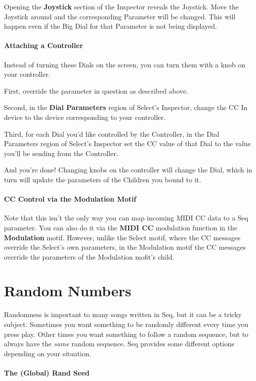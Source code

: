 \documentclass[twoside,10pt]{article}
\begin{document}
Opening the {\bf Joystick} section of the Inspector reveals the Joystick.  Move the Joystick around and the corresponding Parameter will be changed.  This will happen even if the Big Dial for that Parameter is not being displayed.

\paragraph{Attaching a Controller}
Instead of turning these Dials on the screen, you can turn them with a knob on your controller.  

First, override the parameter in question as described above.

Second, in the {\bf Dial Parameters} region of Select's Inspector, change the CC In device to the device corresponding to your controller.

Third, for each Dial you'd like controlled by the Controller, in the Dial Parameters region of Select's Inspector set the CC value of that Dial to the value you'll be sending from the Controller.

And you're done!  Changing knobs on the controller will change the Dial, which in turn will update the parameters of the Children you bound to it.

\paragraph{CC Control via the Modulation Motif}
Note that this isn't the only way you can map incoming MIDI CC data to a Seq parameter.  You can also do it via the {\bf MIDI CC} modulation function in the {\bf Modulation} motif.  However, unlike the Select motif, where the CC messages override the Select's own parameters, in the Modulation motif the CC messages override the parameters of the Modulation mofit's child.


\clearpage\section{Random Numbers}
\label{random}

Randomness is important to many songs written in Seq, but it can be a tricky subject.  Sometimes you want something to be randomly different every time you press play.  Other times you want something to follow a random sequence, but to always have the {\it same} random sequence.  Seq provides some different options depending on your situation.

\paragraph{The (Global) Rand Seed}
\end{document}
